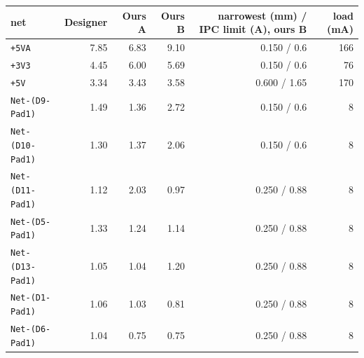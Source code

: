 \begin{tabular}{lrrrrr}
\toprule
net & Designer & Ours A & Ours B & narrowest (mm) / IPC limit (A), ours B & load (mA) \\
\midrule
\texttt{+5VA} & 7.85 & 6.83 & 9.10 & 0.150 / 0.6 & 166 \\
\texttt{+3V3} & 4.45 & 6.00 & 5.69 & 0.150 / 0.6 & 76 \\
\texttt{+5V} & 3.34 & 3.43 & 3.58 & 0.600 / 1.65 & 170 \\
\texttt{Net-(D9-Pad1)} & 1.49 & 1.36 & 2.72 & 0.150 / 0.6 & 8 \\
\texttt{Net-(D10-Pad1)} & 1.30 & 1.37 & 2.06 & 0.150 / 0.6 & 8 \\
\texttt{Net-(D11-Pad1)} & 1.12 & 2.03 & 0.97 & 0.250 / 0.88 & 8 \\
\texttt{Net-(D5-Pad1)} & 1.33 & 1.24 & 1.14 & 0.250 / 0.88 & 8 \\
\texttt{Net-(D13-Pad1)} & 1.05 & 1.04 & 1.20 & 0.250 / 0.88 & 8 \\
\texttt{Net-(D1-Pad1)} & 1.06 & 1.03 & 0.81 & 0.250 / 0.88 & 8 \\
\texttt{Net-(D6-Pad1)} & 1.04 & 0.75 & 0.75 & 0.250 / 0.88 & 8 \\
\bottomrule
\end{tabular}
